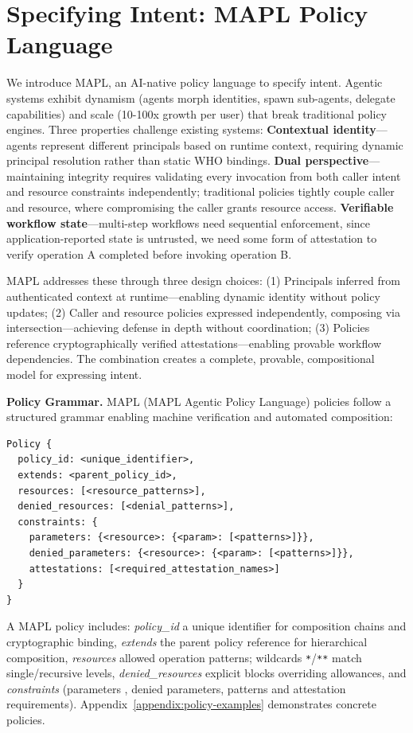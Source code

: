 \section{Specifying Intent: MAPL Policy Language}
\label{sec:policy}

We introduce MAPL, an AI-native policy language to specify intent. Agentic systems exhibit dynamism (agents morph identities, spawn sub-agents, delegate capabilities) and scale (10-100x growth per user) that break traditional policy engines. Three properties challenge existing systems: \textbf{Contextual identity}—agents represent different principals based on runtime context, requiring dynamic principal resolution rather than static WHO bindings. \textbf{Dual perspective}—maintaining integrity requires validating every invocation from both caller intent and resource constraints independently; traditional policies tightly couple caller and resource, where compromising the caller grants resource access. \textbf{Verifiable workflow state}—multi-step workflows need sequential enforcement, since application-reported state is untrusted, we need some form of attestation to verify operation A completed before invoking operation B.

  MAPL addresses these through three design choices: (1) Principals inferred from authenticated context at runtime—enabling dynamic identity without policy updates; (2)
  Caller and resource policies expressed independently, composing via intersection—achieving defense in depth without coordination; (3) Policies reference
  cryptographically verified attestations—enabling provable workflow dependencies. The combination creates a complete, provable, compositional model for expressing
  intent.


\noindent\textbf{Policy Grammar.} MAPL (MAPL Agentic Policy Language) policies follow a structured grammar enabling machine verification and automated composition:

\begin{lstlisting}[basicstyle=\ttfamily\footnotesize]
Policy {
  policy_id: <unique_identifier>,
  extends: <parent_policy_id>,
  resources: [<resource_patterns>],
  denied_resources: [<denial_patterns>],
  constraints: {
    parameters: {<resource>: {<param>: [<patterns>]}},
    denied_parameters: {<resource>: {<param>: [<patterns>]}},
    attestations: [<required_attestation_names>]
  }
}
\end{lstlisting}

A MAPL policy includes: \textit{policy\_id} a unique identifier for composition chains and cryptographic binding, \textit{extends} the parent policy reference for hierarchical composition, \textit{resources} allowed operation patterns; wildcards \texttt{*}/\texttt{**} match single/recursive levels, \textit{denied\_resources} explicit blocks overriding allowances, and \textit{constraints} (parameters , denied parameters, patterns and attestation requirements). Appendix~\ref{appendix:policy-examples} demonstrates concrete policies.

